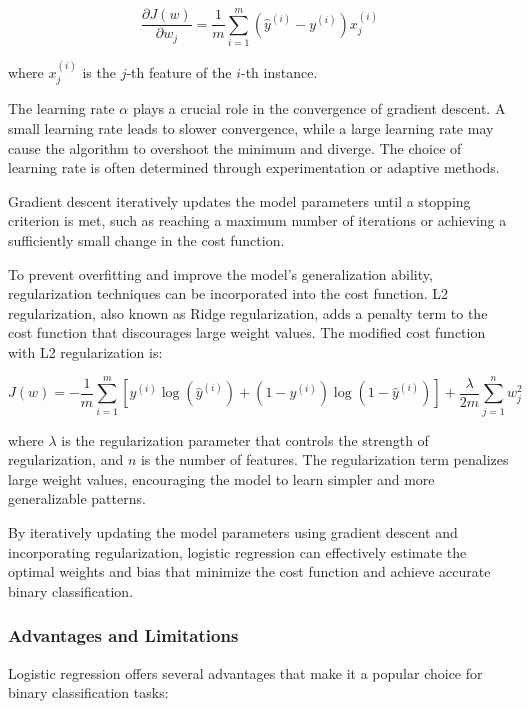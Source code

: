 \documentclass[letterpaper,10pt]{article}
\begin{document}
\[ \frac{\partial J(w)}{\partial w_j} = \frac{1}{m} \sum_{i=1}^{m} (\hat{y}^{(i)} - y^{(i)}) x_j^{(i)} \]

where $x_j^{(i)}$ is the $j$-th feature of the $i$-th instance. \par

The learning rate $\alpha$ plays a crucial role in the convergence of gradient descent. A small learning rate leads to slower convergence, while a large learning rate may cause the algorithm to overshoot the minimum and diverge. The choice of learning rate is often determined through experimentation or adaptive methods. \par

Gradient descent iteratively updates the model parameters until a stopping criterion is met, such as reaching a maximum number of iterations or achieving a sufficiently small change in the cost function. \par

To prevent overfitting and improve the model's generalization ability, regularization techniques can be incorporated into the cost function. L2 regularization, also known as Ridge regularization, adds a penalty term to the cost function that discourages large weight values. The modified cost function with L2 regularization is:

\[ J(w) = -\frac{1}{m} \sum_{i=1}^{m} [y^{(i)} \log(\hat{y}^{(i)}) + (1 - y^{(i)}) \log(1 - \hat{y}^{(i)})] + \frac{\lambda}{2m} \sum_{j=1}^{n} w_j^2 \]

where $\lambda$ is the regularization parameter that controls the strength of regularization, and $n$ is the number of features. The regularization term penalizes large weight values, encouraging the model to learn simpler and more generalizable patterns. \par

By iteratively updating the model parameters using gradient descent and incorporating regularization, logistic regression can effectively estimate the optimal weights and bias that minimize the cost function and achieve accurate binary classification.

\subsubsection{Advantages and Limitations}

Logistic regression offers several advantages that make it a popular choice for binary classification tasks:
\end{document}
